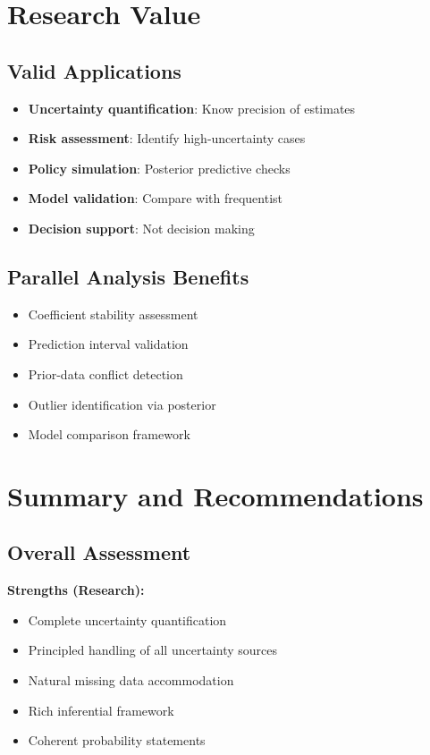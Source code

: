 \section{Research Value}

\subsection{Valid Applications}

\begin{itemize}
    \item \textbf{Uncertainty quantification}: Know precision of estimates
    \item \textbf{Risk assessment}: Identify high-uncertainty cases
    \item \textbf{Policy simulation}: Posterior predictive checks
    \item \textbf{Model validation}: Compare with frequentist
    \item \textbf{Decision support}: Not decision making
\end{itemize}

\subsection{Parallel Analysis Benefits}

\begin{itemize}
    \item Coefficient stability assessment
    \item Prediction interval validation
    \item Prior-data conflict detection
    \item Outlier identification via posterior
    \item Model comparison framework
\end{itemize}

\section{Summary and Recommendations}

\subsection{Overall Assessment}

\textbf{Strengths (Research):}
\begin{itemize}
    \item Complete uncertainty quantification
    \item Principled handling of all uncertainty sources
    \item Natural missing data accommodation
    \item Rich inferential framework
    \item Coherent probability statements
\end{itemize}

